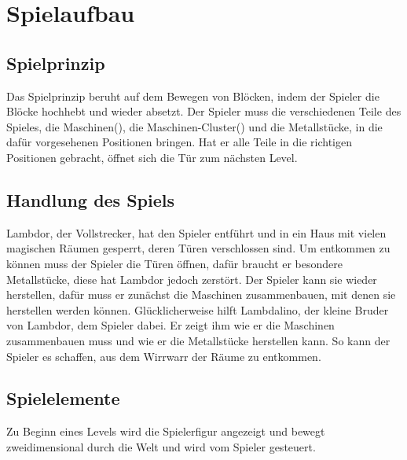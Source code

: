 \documentclass{scrartcl}
\begin{document}
\section{Spielaufbau}

\subsection{Spielprinzip}
Das Spielprinzip beruht auf dem Bewegen von Blöcken, indem der Spieler die Blöcke hochhebt und wieder absetzt. Der Spieler muss die verschiedenen Teile des Spieles, die Maschinen(), die Maschinen-Cluster() und die Metallstücke, in die dafür vorgesehenen Positionen bringen. Hat er alle Teile in die richtigen Positionen gebracht, öffnet sich die Tür zum nächsten Level.

\subsection{Handlung des Spiels}
Lambdor, der Vollstrecker, hat den Spieler entführt und in ein Haus mit vielen magischen Räumen gesperrt, deren Türen verschlossen sind. Um entkommen zu können muss der Spieler die Türen öffnen, dafür braucht er besondere Metallstücke, diese hat Lambdor jedoch zerstört. Der Spieler kann sie wieder herstellen, dafür muss er zunächst die Maschinen zusammenbauen, mit denen sie herstellen werden können. Glücklicherweise hilft Lambdalino, der kleine Bruder von Lambdor, dem Spieler dabei. Er zeigt ihm wie er die Maschinen zusammenbauen muss und wie er die Metallstücke herstellen kann. So kann der Spieler es schaffen, aus dem Wirrwarr der Räume zu entkommen.


\subsection{Spielelemente}

Zu Beginn eines Levels wird die Spielerfigur angezeigt und bewegt zweidimensional durch die Welt und wird vom Spieler gesteuert.
\end{document}
